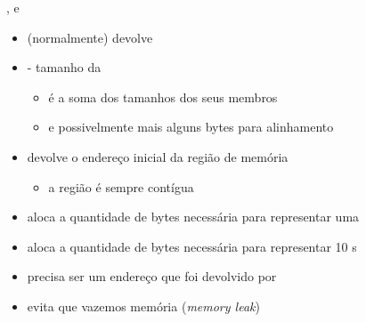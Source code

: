 \documentclass{beamer}
\begin{document}
\begin{frame}[<+->]{,  e }
  \begin{itemize}
    \item {} (normalmente) devolve 
    \item {} - tamanho da 
      \begin{itemize}
        \item é a soma dos tamanhos dos seus membros
        \item e possivelmente mais alguns bytes para alinhamento
      \end{itemize}
  \end{itemize}

  \bigskip
  \begin{itemize}
    \item devolve o endereço inicial da região de memória
      \begin{itemize}
        \item a região é sempre contígua
      \end{itemize}
    \item {} aloca a quantidade de bytes necessária para representar uma 
    \item {} aloca a quantidade de bytes necessária para representar 10 s
  \end{itemize}

  \bigskip
  \begin{itemize}
    \item precisa ser um endereço que foi devolvido por 
    \item evita que vazemos memória (\emph{memory leak})
  \end{itemize}
\end{frame}
\end{document}
